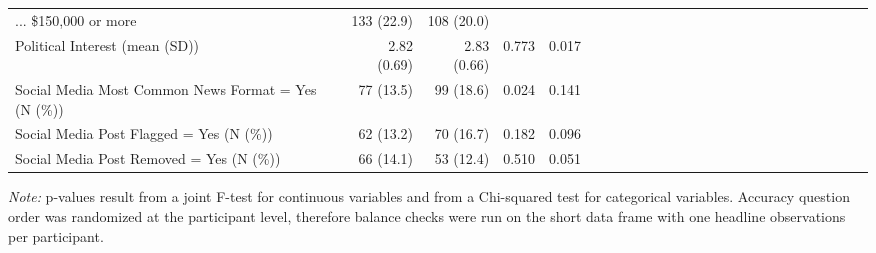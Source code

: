 \begin{table}[!htbp]
{\begin{threeparttable}
\begin{tabular}[t]{l|r|r|r|rl|r|r|r|rl|r|r|r|rl|r|r|r|rl|r|r|r|r}
... \$150,000 or more & 133 (22.9) & 108 (20.0) &  & \\
Political Interest (mean (SD)) & 2.82 (0.69) & 2.83 (0.66) & 0.773 & 0.017\\
Social Media Most Common News Format = Yes (N (\%)) & 77 (13.5) & 99 (18.6) & 0.024 & 0.141\\
Social Media Post Flagged = Yes (N (\%)) & 62 (13.2) & 70 (16.7) & 0.182 & 0.096\\
Social Media Post Removed = Yes (N (\%)) & 66 (14.1) & 53 (12.4) & 0.510 & 0.051\\
\bottomrule
\end{tabular}
\begin{tablenotes}
\item \small{\textit{Note:} p-values result from a joint F-test for continuous variables and from a Chi-squared test for categorical variables. Accuracy question order was randomized at the participant level, therefore balance checks were run on the short data frame with one headline observations per participant.}
\end{tablenotes}
\end{threeparttable}}
\end{table}
